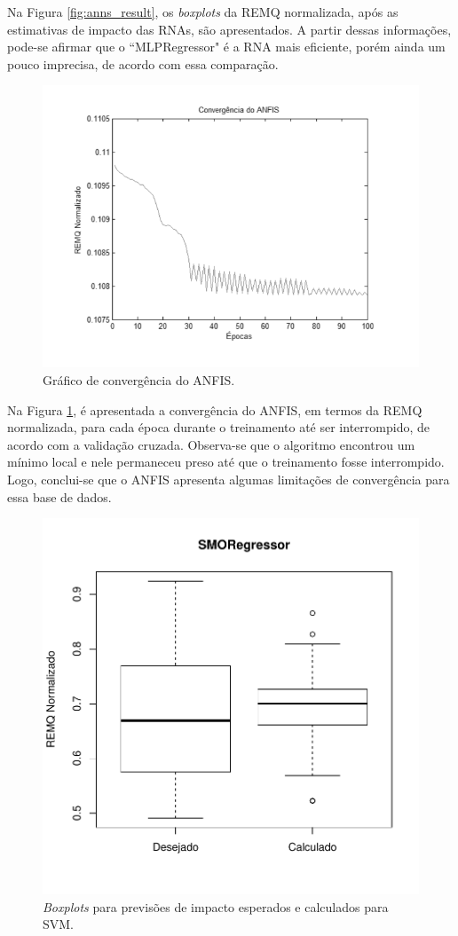 Na Figura \ref{fig:anns_result}, os \textit{boxplots} da REMQ normalizada, após as estimativas de impacto das RNAs, são apresentados. A partir dessas informações, pode-se afirmar que o ``MLPRegressor" é a RNA mais eficiente, porém ainda um pouco imprecisa, de acordo com essa comparação.

\begin{figure}[!h]
  \centering
  \includegraphics[trim = 1mm 12mm 1mm 8mm,clip,width=\columnwidth]{image/epocas.png}
  \caption{Gráfico de convergência do ANFIS.}
  \label{fig:anns_result_2}
\end{figure}

Na Figura \ref{fig:anns_result_2}, é apresentada a convergência do ANFIS, em termos da REMQ normalizada, para cada época durante o treinamento até ser interrompido, de acordo com a validação cruzada. Observa-se que o algoritmo encontrou um mínimo local e nele permaneceu preso até que o treinamento fosse interrompido. Logo, conclui-se que o ANFIS apresenta algumas limitações de convergência para essa base de dados.

\begin{figure}[!h]
  \vspace{-0.2cm}
  \centering
  \includegraphics[trim = 1mm 12mm 1mm 1mm,clip,width=0.7\columnwidth]{image/smoreg_ex4.pdf}
  \caption{\textit{Boxplots} para previsões de impacto esperados e calculados para SVM.}
  \label{fig:anns_result_5}
\end{figure}


